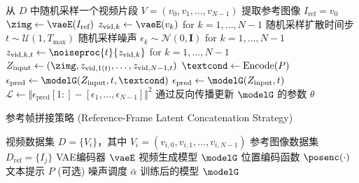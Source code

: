 {{\begin{algorithm}
\begin{algorithmic}[1]
        \State 从 $D$ 中随机采样一个视频片段 $V = (v_0, v_1, \dots, v_{N-1})$
        \State 提取参考图像 $I_{\text{ref}} = v_0$
        \State {}
        \State $\zimg \gets \vaeE(I_{\text{ref}})$
        \State {}
        \State $z_{\text{vid},k} \gets \vaeE(v_k)$ for $k=1, \dots, N-1$
        \State 随机采样扩散时间步 $t \sim \mathcal{U}(1, T_{\text{max}})$
        \State 随机采样噪声 $\epsilon_k \sim \mathcal{N}(0, \mathbf{I})$ for $k=1, \dots, N-1$
        \State {}
        \State  $z_{\text{vid},k,t}\gets \noiseproc{t}{z_{\text{vid},k}}$ for $k=1, \dots, N-1$
        \State {}
        \State $Z_{\text{input}} \gets (\zimg, z_{\text{vid},1(t)}, \dots, z_{\text{vid},N-1,t})$
            \State $\textcond \gets \text{Encode}(P)$ 
            \State $\epsilon_{\text{pred}} \gets \modelG(Z_{\text{input}}, t, \textcond)$
        \Else
            \State $\epsilon_{\text{pred}} \gets \modelG(Z_{\text{input}}, t)$
        \EndIf
        \State {}
        \State $\mathcal{L} \gets \Vert \epsilon_{\text{pred}}[1:] - [\epsilon_1, \dots, \epsilon_{N-1}] \Vert^2$ 
        \State 通过反向传播更新 $\modelG$ 的参数 $\theta$
    \EndFor
    \end{algorithmic}
\end{algorithm}
}
{\small
\begin{algorithm}
    \setlength{\baselineskip}{0.9\baselineskip}
    \caption{参考帧拼接策略 (Reference-Frame Latent Concatenation Strategy)}
    \label{alg:ref_frame_concat}
    \begin{algorithmic}[1]
    \Require
        \Statex 视频数据集 $D = \{V_i\}$，其中 $V_i = (v_{i,0}, v_{i,1}, \dots, v_{i,N-1})$
        \Statex 参考图像数据集 $D_{\text{ref}} = \{I_j\}$
        \Statex VAE编码器 $\vaeE$
        \Statex 视频生成模型 $\modelG$
        \Statex 位置编码函数 $\posenc(\cdot)$
        \Statex 文本提示 $P$ (可选)
        \Statex 噪声调度 $\bar{\alpha}$
    \Ensure 训练后的模型 $\modelG$
    

\end{algorithmic}
\end{algorithm}}}
